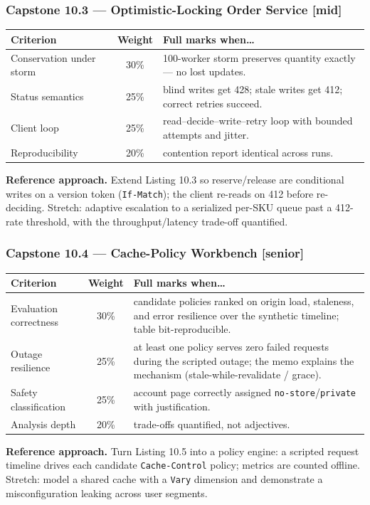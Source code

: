 \subsubsection*{Capstone 10.3 --- Optimistic-Locking Order Service [mid]}
\begin{center}\small
\begin{tabularx}{\textwidth}{l c X}
\toprule
\textbf{Criterion} & \textbf{Weight} & \textbf{Full marks when\ldots} \\
\midrule
Conservation under storm & 30\% & 100-worker storm preserves quantity exactly --- no lost updates. \\
Status semantics & 25\% & blind writes get 428; stale writes get 412; correct retries succeed. \\
Client loop & 25\% & read--decide--write--retry loop with bounded attempts and jitter. \\
Reproducibility & 20\% & contention report identical across runs. \\
\bottomrule
\end{tabularx}
\end{center}
\textbf{Reference approach.} Extend Listing 10.3 so reserve/release are
conditional writes on a version token (\texttt{If-Match}); the client
re-reads on 412 before re-deciding. Stretch: adaptive escalation to a
serialized per-SKU queue past a 412-rate threshold, with the
throughput/latency trade-off quantified.

\subsubsection*{Capstone 10.4 --- Cache-Policy Workbench [senior]}
\begin{center}\small
\begin{tabularx}{\textwidth}{l c X}
\toprule
\textbf{Criterion} & \textbf{Weight} & \textbf{Full marks when\ldots} \\
\midrule
Evaluation correctness & 30\% & candidate policies ranked on origin load, staleness, and error resilience over the synthetic timeline; table bit-reproducible. \\
Outage resilience & 25\% & at least one policy serves zero failed requests during the scripted outage; the memo explains the mechanism (stale-while-revalidate / grace). \\
Safety classification & 25\% & account page correctly assigned \texttt{no-store}/\texttt{private} with justification. \\
Analysis depth & 20\% & trade-offs quantified, not adjectives. \\
\bottomrule
\end{tabularx}
\end{center}
\textbf{Reference approach.} Turn Listing 10.5 into a policy engine: a
scripted request timeline drives each candidate \texttt{Cache-Control}
policy; metrics are counted offline. Stretch: model a shared cache with a
\texttt{Vary} dimension and demonstrate a misconfiguration leaking across
user segments.

